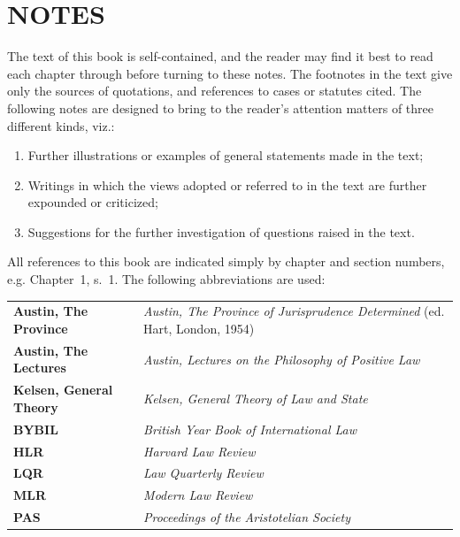 \newpage

\section{NOTES}

The text of this book is self-contained, and the reader may find it best to read each chapter through before turning to these notes. The footnotes in the text give only the sources of quotations, and references to cases or statutes cited. The following notes are designed to bring to the reader's attention matters of three different kinds, viz.:

\begin{enumerate}[label=(\roman*)]
  \item Further illustrations or examples of general statements made in the text;
  \item Writings in which the views adopted or referred to in the text are further expounded or criticized;
  \item Suggestions for the further investigation of questions raised in the text.
\end{enumerate}

All references to this book are indicated simply by chapter and section numbers, e.g. Chapter~1, s.~1. The following abbreviations are used:

\vspace{0.4em}

\begin{tabular}{@{}l p{6.7cm}@{}}
\textbf{Austin, The Province}   & \textit{\small Austin, The Province of Jurisprudence Determined} (ed. Hart, London, 1954) \\
\textbf{Austin, The Lectures}   & \textit{\small Austin, Lectures on the Philosophy of Positive Law} \\
\textbf{Kelsen, General Theory} & \textit{\small Kelsen, General Theory of Law and State} \\
\textbf{BYBIL}                  & \textit{\small British Year Book of International Law} \\
\textbf{HLR}                    & \textit{\small Harvard Law Review} \\
\textbf{LQR}                    & \textit{\small Law Quarterly Review} \\
\textbf{MLR}                    & \textit{\small Modern Law Review} \\
\textbf{PAS}                    & \textit{\small Proceedings of the Aristotelian Society} \\
\end{tabular}

